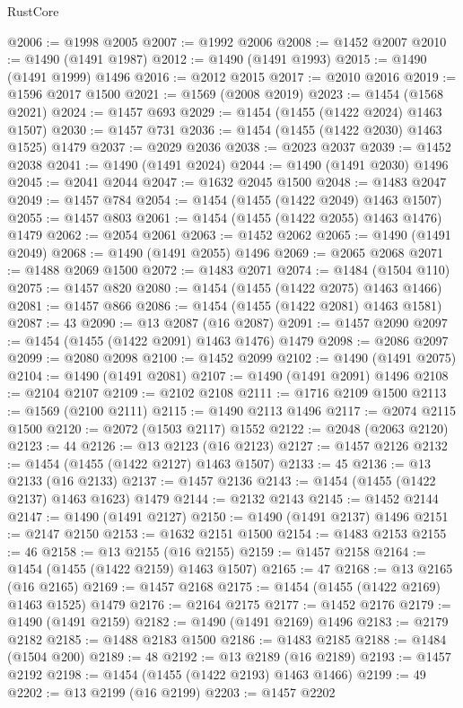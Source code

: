 \begin{lexlean}{RustCore}
\begin{coremodule}
@2006 := @1998 @2005
@2007 := @1992 @2006
@2008 := @1452 @2007
@2010 := @1490 (@1491 @1987)
@2012 := @1490 (@1491 @1993)
@2015 := @1490 (@1491 @1999) @1496
@2016 := @2012 @2015
@2017 := @2010 @2016
@2019 := @1596 @2017 @1500
@2021 := @1569 (@2008 @2019)
@2023 := @1454 (@1568 @2021)
@2024 := @1457 @693
@2029 := @1454 (@1455 (@1422 @2024) @1463 @1507)
@2030 := @1457 @731
@2036 := @1454 (@1455 (@1422 @2030) @1463 @1525) @1479
@2037 := @2029 @2036
@2038 := @2023 @2037
@2039 := @1452 @2038
@2041 := @1490 (@1491 @2024)
@2044 := @1490 (@1491 @2030) @1496
@2045 := @2041 @2044
@2047 := @1632 @2045 @1500
@2048 := @1483 @2047
@2049 := @1457 @784
@2054 := @1454 (@1455 (@1422 @2049) @1463 @1507)
@2055 := @1457 @803
@2061 := @1454 (@1455 (@1422 @2055) @1463 @1476) @1479
@2062 := @2054 @2061
@2063 := @1452 @2062
@2065 := @1490 (@1491 @2049)
@2068 := @1490 (@1491 @2055) @1496
@2069 := @2065 @2068
@2071 := @1488 @2069 @1500
@2072 := @1483 @2071
@2074 := @1484 (@1504 @110)
@2075 := @1457 @820
@2080 := @1454 (@1455 (@1422 @2075) @1463 @1466)
@2081 := @1457 @866
@2086 := @1454 (@1455 (@1422 @2081) @1463 @1581)
@2087 := 43
@2090 := @13 @2087 (@16 @2087)
@2091 := @1457 @2090
@2097 := @1454 (@1455 (@1422 @2091) @1463 @1476) @1479
@2098 := @2086 @2097
@2099 := @2080 @2098
@2100 := @1452 @2099
@2102 := @1490 (@1491 @2075)
@2104 := @1490 (@1491 @2081)
@2107 := @1490 (@1491 @2091) @1496
@2108 := @2104 @2107
@2109 := @2102 @2108
@2111 := @1716 @2109 @1500
@2113 := @1569 (@2100 @2111)
@2115 := @1490 @2113 @1496
@2117 := @2074 @2115 @1500
@2120 := @2072 (@1503 @2117) @1552
@2122 := @2048 (@2063 @2120)
@2123 := 44
@2126 := @13 @2123 (@16 @2123)
@2127 := @1457 @2126
@2132 := @1454 (@1455 (@1422 @2127) @1463 @1507)
@2133 := 45
@2136 := @13 @2133 (@16 @2133)
@2137 := @1457 @2136
@2143 := @1454 (@1455 (@1422 @2137) @1463 @1623) @1479
@2144 := @2132 @2143
@2145 := @1452 @2144
@2147 := @1490 (@1491 @2127)
@2150 := @1490 (@1491 @2137) @1496
@2151 := @2147 @2150
@2153 := @1632 @2151 @1500
@2154 := @1483 @2153
@2155 := 46
@2158 := @13 @2155 (@16 @2155)
@2159 := @1457 @2158
@2164 := @1454 (@1455 (@1422 @2159) @1463 @1507)
@2165 := 47
@2168 := @13 @2165 (@16 @2165)
@2169 := @1457 @2168
@2175 := @1454 (@1455 (@1422 @2169) @1463 @1525) @1479
@2176 := @2164 @2175
@2177 := @1452 @2176
@2179 := @1490 (@1491 @2159)
@2182 := @1490 (@1491 @2169) @1496
@2183 := @2179 @2182
@2185 := @1488 @2183 @1500
@2186 := @1483 @2185
@2188 := @1484 (@1504 @200)
@2189 := 48
@2192 := @13 @2189 (@16 @2189)
@2193 := @1457 @2192
@2198 := @1454 (@1455 (@1422 @2193) @1463 @1466)
@2199 := 49
@2202 := @13 @2199 (@16 @2199)
@2203 := @1457 @2202

\end{coremodule}
\end{lexlean}
